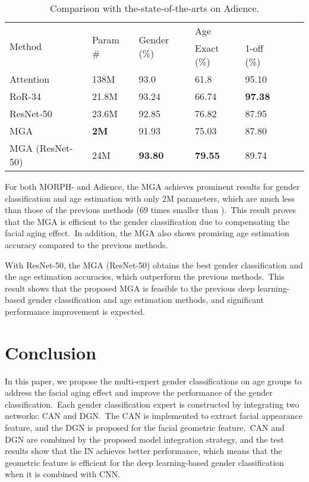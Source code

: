 \documentclass[10pt,twocolumn,letterpaper]{article}
\begin{document}
\begin{table}[!h]
\centering
\caption{Comparison with the-state-of-the-arts on Adience.}
\label{Comparison with the-state-of-the-arts on Adience}

\begin{adjustbox}{width=0.48\textwidth}
\begin{tabular}{p{3cm}llllll}

\hline
\multirow{2}{*}{Method} & \multirow{2}{*}{Param \#} & \multirow{2}{*}{Gender (\%)} & \multicolumn{2}{l}{Age} \\ \cline{4-5} 
 &  &  & Exact (\%) & 1-off (\%) \\ \hline
 Attention~\cite{RODRIGUEZ2017563} & 138M & 93.0 & 61.8 & 95.10 \\
 RoR-34~\cite{Zhang2017}& 21.8M & 93.24 & 66.74 & \textbf{97.38} \\
 ResNet-50 & 23.6M & 92.85& 76.82& 87.95\\
 MGA & \textbf{2M} & 91.93 & 75.03 & 87.80 \\ 
 MGA (ResNet-50)    & 24M   &   \textbf{93.80}    &  \textbf{79.55}     & 89.74  \\\hline
 
\end{tabular}
\end{adjustbox}
\end{table}

For both MORPH- and Adience, the MGA achieves prominent results for gender classification and age estimation with only 2M parameters, which are much less than those of the previous methods (69 times smaller than \cite{RODRIGUEZ2017563, Xing2017}).~This result proves that the MGA is efficient to the gender classification due to compensating the facial aging effect.~In addition, the MGA also shows promising age estimation accuracy compared to the previous methods.

With ResNet-50, the MGA (ResNet-50) obtains the best gender classification and the age estimation accuracies, which outperform the previous methods.~This result shows that the proposed MGA is feasible to the previous deep learning-based gender classification and age estimation methods, and significant performance improvement is expected.

\section{Conclusion}
In this paper, we propose the multi-expert gender classifications on age groups to address the facial aging effect and improve the performance of the gender classification.~Each gender classification expert is constructed by integrating two networks: CAN and DGN.~The CAN is implemented to extract facial appearance feature, and the DGN is proposed for the facial geometric feature.~CAN and DGN are combined by the proposed model integration strategy, and the test results show that the IN achieves better performance, which means that the geometric feature is efficient for the deep learning-based gender classification when it is combined with CNN.
\end{document}
